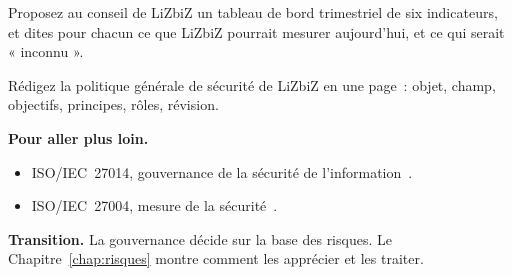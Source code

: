 \begin{boxexo}[title={\ding{45}\quad Exercice~6.9. Le tableau de bord \niveauexpert}]
Proposez au conseil de LiZbiZ un tableau de bord trimestriel de six
indicateurs, et dites pour chacun ce que LiZbiZ pourrait mesurer
aujourd'hui, et ce qui serait « inconnu ».
\end{boxexo}

\begin{boxexo}[title={\ding{45}\quad Exercice~6.10. La politique générale \niveauexpert}]
Rédigez la politique générale de sécurité de LiZbiZ en une page~: objet,
champ, objectifs, principes, rôles, révision.
\end{boxexo}

\bigskip

\begin{boxinfo}
\textbf{Pour aller plus loin.}
\begin{itemize}
    \item ISO/IEC~27014, gouvernance de la sécurité de
          l'information~\cite{iso27014_2020}.
    \item ISO/IEC~27004, mesure de la sécurité~\cite{iso27004_2016}.
\end{itemize}
\end{boxinfo}

\begin{boxinfo}
\textbf{Transition.} La gouvernance décide sur la base des risques. Le
Chapitre~\ref{chap:risques} montre comment les apprécier et les traiter.
\end{boxinfo}
